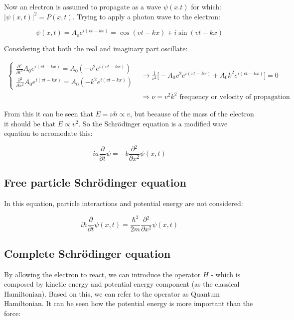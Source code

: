 Now an electron is assumed to propagate as a wave $\psi(x.t)$ for which: $|\psi(x,t)|^2 = P(x,t)$.
Trying to apply a photon wave to the electron:

$$\psi(x,t) = A_oe^{i(vt-kx)} = \cos(vt-kx) + i\sin(vt - kx)$$

Considering that both the real and imaginary part oscillate:

\begin{align*}
  \begin{cases}\frac{\partial {^2}}{\partial {t^2}}A_0e^{i(vt-kx)} = A_0(-v^2e^{i(vt-kx)})\\\frac{\partial {^2}}{\partial {x^2}}A_0e^{i(vt-kx)} = A_0(-k^2e^{i(vt-kx)})\end{cases}&\rightarrow \frac{1}{\nu^2}\biggl[-A_0v^2e^{i(vt-kx)}+A_0k^2e^{i(vt-kx)}\biggr] = 0\\
                                                                                                                                                                                  &\Rightarrow \nu = v^2k^2\text{ frequency or velocity of propagation}
\end{align*}

From this it can be seen that $E=\nu h\propto v$, but because of the mass of the electron it should be that $E\propto v^2$.
So the Schr\"odinger equation is a modified wave equation to accomodate this:

$$ia \frac{\partial {}}{\partial {t}}\psi=-b \frac{\partial {^2}}{\partial {x^2}}\psi(x,t)$$

  \subsection{Free particle Schr\"odinger equation}
  In this equation, particle interactions and potential energy are not considered:

  $$i\hbar \frac{\partial {}}{\partial {t}}\psi(x,t) = \frac{\hbar^2}{2m}\frac{\partial {^2}}{\partial {x^2}}\psi(x,t)$$

  \subsection{Complete Schr\"odinger equation}
  By allowing the electron to react, we can introduce the operator $H$ - which is composed by kinetic energy and potential energy component (as the classical Hamiltonian).
  Based on this, we can refer to the operator as Quantum Hamiltonian.
  It can be seen how the potential energy is more important than the force:

